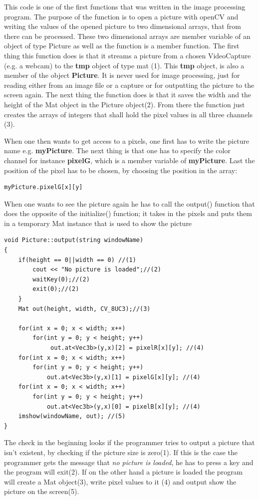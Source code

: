 This code is one of the first functions that was written in the image processing program. The purpose of the function is to open a picture with openCV and writing the values of the opened picture to two dimensional arrays, that from there can be processed. These two dimensional arrays are member variable of an object of type Picture as well as the function is a member function. 
The first thing this function does is that it streams a picture from a chosen VideoCapture (e.g. a webcam) to the \textbf{tmp} object of type mat (1). This \textbf{tmp} object, is also a member of the object \textbf{Picture}. It is never used for image processing, just for reading either from an image file or a capture or for outputting the picture to the screen again. The next thing the function does is that it saves the width and the height of the Mat object in the Picture object(2). From there the function just creates the arrays of integers that shall hold the pixel values in all three channels (3). 

When one then wants to get access to a pixels, one first has to write the picture name e.g. \textbf{myPicture}. The next thing is that one has to specify the color channel for instance \textbf{pixelG}, which is a member variable of \textbf{myPicture}. Last the position of the pixel has to be chosen, by choosing the position in the array:

\begin{lstlisting}
myPicture.pixelG[x][y]
\end{lstlisting}

When one wants to see the picture again he has to call the output() function that does the opposite of the initialize() function; it takes in the pixels and puts them in a temporary Mat instance that is used to show the picture

\begin{lstlisting}
void Picture::output(string windowName)
{
	if(height == 0||width == 0) //(1)
		cout << "No picture is loaded";//(2)
		waitKey(0);//(2)
		exit(0);//(2)
	}
	Mat out(height, width, CV_8UC3);//(3)

	for(int x = 0; x < width; x++)
		for(int y = 0; y < height; y++)
			 out.at<Vec3b>(y,x)[2] = pixelR[x][y]; //(4)
	for(int x = 0; x < width; x++)
		for(int y = 0; y < height; y++)
			out.at<Vec3b>(y,x)[1] = pixelG[x][y]; //(4)
	for(int x = 0; x < width; x++)
		for(int y = 0; y < height; y++)
			out.at<Vec3b>(y,x)[0] = pixelB[x][y]; //(4)		
	imshow(windowName, out); //(5)
}
\end{lstlisting}
The check in the beginning looks if the programmer tries to output a picture that isn't existent, by checking if the picture size is zero(1). If this is the case the programmer gets the message that \textit{no picture is loaded}, he has to press a key and the program will exit(2). If on the other hand a picture is loaded the program will create a Mat object(3), write pixel values to it (4) and output show the picture on the screen(5). 

